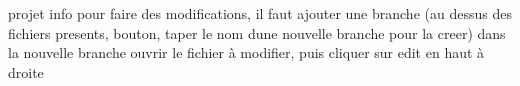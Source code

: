 projet info pour faire des modifications, il faut ajouter une branche (au dessus des fichiers presents, bouton, taper le nom d\textquotesingle{}une nouvelle branche pour la creer) dans la nouvelle branche ouvrir le fichier à modifier, puis cliquer sur edit en haut à droite 